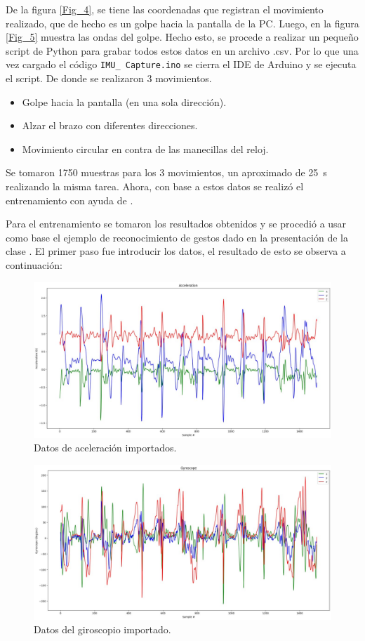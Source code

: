 De la figura \ref{Fig_4}, se tiene las coordenadas que registran el movimiento realizado, que de hecho es un golpe hacia la pantalla de la PC. Luego, en la figura \ref{Fig_5} muestra las ondas del golpe. Hecho esto, se procede a realizar un pequeño script de Python para grabar todos estos datos en un archivo .csv. Por lo que una vez cargado el código \texttt{IMU\_ Capture.ino} se cierra el IDE de Arduino y se ejecuta el script. De donde se realizaron 3 movimientos.
\begin{itemize}
\item Golpe hacia la pantalla (en una sola dirección).
\item Alzar el brazo con diferentes direcciones.
 \item Movimiento circular en contra de las manecillas del reloj.
\end{itemize}
Se tomaron 1750 muestras para los 3 movimientos, un aproximado de \SI{25}{\s} realizando la misma tarea. Ahora, con base a estos datos se realizó el entrenamiento con ayuda de \cite{web4}.\par


Para el entrenamiento se tomaron los resultados obtenidos y se procedió a usar como base el ejemplo de reconocimiento de gestos dado en la presentación de la clase \cite{web4}.
El primer paso fue introducir los datos, el resultado de esto se observa a continuación:
\begin{figure}[H]
    \centering
    \includegraphics[width=.65\linewidth]{Imagenes/k (1).jpg}
    \caption{Datos de aceleración importados.}
\end{figure}

\begin{figure}[H]
    \centering
    \includegraphics[width=.65\linewidth]{Imagenes/k (2).jpg}
    \caption{Datos del giroscopio importado.}
\end{figure}

